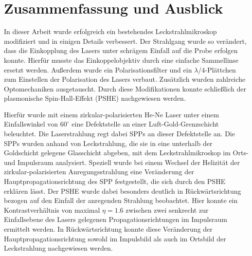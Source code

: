 \documentclass[a4paper, titlepage,  ngerman, fullpage]{book}
\begin{document}
	\newpage
	\chapter{Zusammenfassung und Ausblick}
	In dieser Arbeit wurde erfolgreich ein bestehendes Leckstrahlmikroskop modifiziert und in einigen Details verbessert. Der Strahlgang wurde so verändert, dass die Einkopplung des Lasers unter schrägem Einfall auf die Probe erfolgen konnte. Hierfür musste das Einkoppelobjektiv durch eine einfache Sammellinse ersetzt werden. Außerdem wurde ein Polarisationsfilter und ein $\lambda/4$-Plättchen zum Einstellen der Polarisation des Lasers verbaut. Zusätzlich wurden zahlreiche Optomechaniken ausgetauscht. Durch diese Modifikationen konnte schließlich der plasmonische Spin-Hall-Effekt (PSHE) nachgewiesen werden.
	
	Hierfür wurde mit einem zirkular-polarisierten He-Ne Laser unter einem Einfallswinkel von $60^\circ$ eine Defektstelle an einer Luft-Gold-Grenzschicht beleuchtet. Die Laserstrahlung regt dabei SPPs an dieser Defektstelle an. Die SPPs wurden anhand von Leckstrahlung, die sie in eine unterhalb der Goldschicht gelegene Glasschicht abgeben, mit dem Leckstrahlmikroskop im Orts- und Impulsraum analysiert. Speziell wurde bei einem Wechsel der Helizität der zirkular-polarisierten Anregungsstrahlung eine Veränderung der Hauptpropagationsrichtung des SPP festgestellt, die sich durch den PSHE erklären lässt. Der PSHE wurde dabei besonders deutlich in Rückwärtsrichtung bezogen auf den Einfall der anregenden Strahlung beobachtet. Hier konnte ein Kontrastverhältnis von maximal $\eta = 1.6$ zwischen zwei senkrecht zur Einfallsebene des Lasers gelegenen Propagationsrichtungen im Impulsraum ermittelt werden. In Rückwärtsrichtung konnte diese Veränderung der Hauptpropagationsrichtung sowohl im Impulsbild als auch im Ortsbild der Leckstrahlung nachgewiesen werden. 
		
\end{document}

